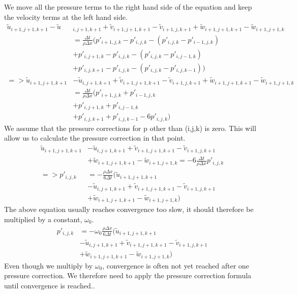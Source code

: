 \documentclass{article}
\begin{document}
We move all the pressure terms to the right hand side of the equation and keep the velocity terms at the left hand side.
\[
  \begin{split}
    \tilde{u}_{i+1,j+1,k+1}-\tilde{u}&_{i, j+1, k+1}
    +\tilde{v}_{i+1,j+1,k+1}-\tilde{v}_{i+1, j, k+1}
    +\tilde{w}_{i+1,j+1,k+1}
    -\tilde{w}_{i+1, j+1, k}\\
    &=\frac{\Delta t}{\rho \Delta x}(p'_{i+1,j,k}-p'_{i,j,k} - (p'_{i,j,k}-p'_{i-1,j,k})\\
    &+p'_{i,j+1,k}-p'_{i,j,k}-(p'_{i,j,k}-p'_{i,j-1,k})\\
    &+p'_{i,j,k+1}-p'_{i,j,k}- (p'_{i,j,k}-p'_{i,j,k-1}))\\
    =>\tilde{u}_{i+1,j+1,k+1}&-\tilde{u}_{i, j+1, k+1}
    +\tilde{v}_{i+1,j+1,k+1}-\tilde{v}_{i+1, j, k+1}
    +\tilde{w}_{i+1,j+1,k+1}
    -\tilde{w}_{i+1, j+1, k}\\
    &=\frac{\Delta t}{\rho \Delta x}(p'_{i+1,j,k} + p'_{i-1,j,k}\\
    &+p'_{i,j+1,k}+p'_{i,j-1,k}\\
    &+p'_{i,j,k+1}+p'_{i,j,k-1} - 6 p'_{i,j,k})
  \end{split}
\]
We assume that the pressure corrections for p other than (i,j,k) is zero. This will allow us to calculate the pressure correction in that point.\cite{MAC}
\[
  \begin{split}
  \tilde{u}_{i+1,j+1,k+1}&-\tilde{u}_{i, j+1, k+1}
    +\tilde{v}_{i+1,j+1,k+1}-\tilde{v}_{i+1, j, k+1}
    \\ &+\tilde{w}_{i+1,j+1,k+1}
    -\tilde{w}_{i+1, j+1, k}
     =-6\frac{\Delta t}{\rho \Delta x}p'_{i,j,k}\\
      =>p'_{i,j,k}&=-\frac{\rho \Delta x}{6\Delta t}(\tilde{u}_{i+1,j+1,k+1} \\ &-\tilde{u}_{i, j+1, k+1}
    +\tilde{v}_{i+1,j+1,k+1}-\tilde{v}_{i+1, j, k+1}
    \\ &+\tilde{w}_{i+1,j+1,k+1}
    -\tilde{w}_{i+1, j+1, k})
  \end{split}
\]
The above equation usually reaches convergence too slow, it should therefore be multiplied by a constant, \(\omega _0\).
\[
\begin{split}
  p'_{i,j,k}&=-\omega _0\frac{\rho \Delta x}{6\Delta t}(\tilde{u}_{i+1,j+1,k+1}
  \\ &-\tilde{u}_{i, j+1, k+1}
  +\tilde{v}_{i+1,j+1,k+1}-\tilde{v}_{i+1, j, k+1}
  \\ &+\tilde{w}_{i+1,j+1,k+1}
  -\tilde{w}_{i+1, j+1, k})
\end{split}
\]
Even though we multiply by \(\omega _0\), convergence is often not yet reached after one pressure correction. We therefore need to apply the pressure correction formula until convergence is reached.\cite{MAC}.
\end{document}
